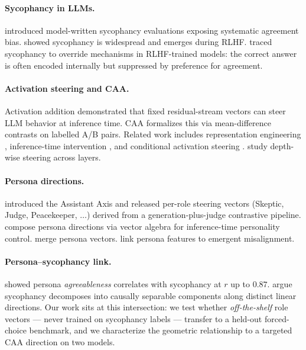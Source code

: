 \documentclass{article}
\theoremstyle{plain}
\theoremstyle{definition}
\theoremstyle{remark}
\begin{document}
\paragraph{Sycophancy in LLMs.}
\citet{perez2022} introduced model-written sycophancy evaluations exposing systematic agreement bias. \citet{sharma2023} showed sycophancy is widespread and emerges during RLHF. \citet{wang2025a} traced sycophancy to override mechanisms in RLHF-trained models: the correct answer is often encoded internally but suppressed by preference for agreement.

\paragraph{Activation steering and CAA.}
Activation addition \cite{turner2023} demonstrated that fixed residual-stream vectors can steer LLM behavior at inference time. CAA \cite{rimsky2024} formalizes this via mean-difference contrasts on labelled A/B pairs. Related work includes representation engineering \cite{zou2023}, inference-time intervention \cite{li2023}, and conditional activation steering \cite{lee2025}. \citet{goral2025} study depth-wise steering across layers.

\paragraph{Persona directions.}
\citet{lu2026} introduced the Assistant Axis and released per-role steering vectors (Skeptic, Judge, Peacekeeper, $\ldots$) derived from a generation-plus-judge contrastive pipeline. \citet{feng2026} compose persona directions via vector algebra for inference-time personality control. \citet{pai2025} merge persona vectors. \citet{wang2025b} link persona features to emergent misalignment.

\paragraph{Persona--sycophancy link.}
\citet{shah2026} showed persona \emph{agreeableness} correlates with sycophancy at $r$ up to $0.87$. \citet{vennemeyer2025} argue sycophancy decomposes into causally separable components along distinct linear directions. Our work sits at this intersection: we test whether \emph{off-the-shelf} role vectors --- never trained on sycophancy labels --- transfer to a held-out forced-choice benchmark, and we characterize the geometric relationship to a targeted CAA direction on two models.
\end{document}
